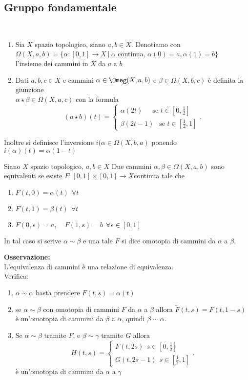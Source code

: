 \documentclass[12px]{article}
\begin{document}
	\subsection{Gruppo fondamentale}
	\begin{defi}
		\ \\[-30px]
		\begin{enumerate}
			\item Sia $X$ spazio topologico, siano $a,b\in X$. Denotiamo con  \\$\Omega (X,a,b) = \{\alpha:[0,1] \rightarrow X\ | \ \alpha$ continua, $\alpha(0) = a, \alpha(1) = b\}$ \\
		l'insieme dei cammini in $X$ da $a$ a $b$
	\item  Dati $a,b,c\in X$ e cammini $\alpha\in\Omeg(X,a,b)$ e  $\beta\in\Omega(X,b,c)$ è definita la giunzione\\
		 $\alpha\star\beta\in\Omega(X,a,c)$ con la formula
		  \[
			  (a\star b)(t) = \begin{cases}
				  \alpha(2t) \ \ \ \ \ \text{ se } t\in[0,\frac 12]\\
				  \beta (2t-1) \ \ \text{ se } t\in[\frac 12, 1]
			  \end{cases}
		 .\] 
		\end{enumerate}
		Inoltre si definisce l'inversione $i(\alpha\in\Omega(X,b,a)$ ponendo $i(\alpha)(t) = \alpha(1 - t)$
	\end{defi}
	\begin{defi}
		Siano $X$ spazio topologico, $a,b\in X$ Due cammini  $\alpha,\beta\in\Omega(X,a,b)$ sono equivalenti
	se esiste $F:[0,1]\times[0,1] \rightarrow X $continua tale che
	\begin{enumerate}
		\item $F(t,0) = \alpha(t) \ \ \forall t$
		\item $F(t,1) = \beta(t) \ \ \forall t$
		\item $F(0,s) = a,\ \ \ \ \  F(1,s) = b\ \ \forall s\in [0,1]$
	\end{enumerate}
	In tal caso si scrive $\alpha \sim \beta$ e una tale  $F$ si dice omotopia di cammini da $\alpha$ a $\beta$.
\end{defi}
\textbf{Osservazione:}\\
L'equivalenza di cammini è una relazione di equivalenza.\\
Verifica:
\begin{enumerate}
	\item $\alpha\sim\alpha$ basta prendere $F(t,s) = \alpha(t)$
	\item se $\alpha\sim\beta$ con omotopia di cammini  $F$ da $\alpha$ a $\beta $ allora $\tilde F (t,s) = F(t,1-s)$ è un'omotopia di cammini da  $\beta$ a $\alpha$, quindi $\beta\sim\alpha.$
	\item Se  $\alpha\sim \beta $ tramite  $F$, e $\beta\sim \gamma$ tramite $G$ allora 
		\[
		H(t,s) = \begin{cases}
			F(t,2s) \ \ s\in [0,\frac 12]\\
			G(t,2s - 1) \ \ s\in[\frac 12, 1]
		\end{cases}
		.\] 
		è un'omotopia di cammini da $\alpha $ a $\gamma$
\end{enumerate}
\end{document}
